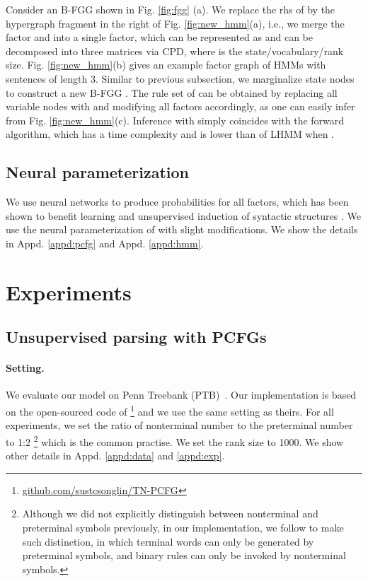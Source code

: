 \documentclass[11pt]{article}
\begin{document}
Consider an B-FGG  shown in Fig. \ref{fig:fgg} (a). We replace the rhs of  by the hypergraph fragment in the right of Fig. \ref{fig:new_hmm}(a), i.e., we merge the factor  and  into a single factor, which can be represented as  and can be decomposed into three matrices  via CPD, where  is the  state/vocabulary/rank size. Fig. \ref{fig:new_hmm}(b) gives an example factor graph of HMMs with sentences of length 3. Similar to previous subsection, we marginalize state nodes  to construct a new B-FGG . The rule set of  can be obtained by replacing all variable nodes  with  and modifying all factors accordingly, as one can 
easily infer from Fig. \ref{fig:new_hmm}(c). Inference with  simply coincides with the forward algorithm, which has a  time complexity and is lower than  of LHMM \cite{chiu2021low} when .

\subsection{Neural parameterization}
We use neural networks to produce probabilities for all factors, which has been shown to benefit learning and unsupervised induction of syntactic structures \cite{jiang-etal-2016-unsupervised, he-etal-2018-unsupervised, kim-etal-2019-compound, han-etal-2019-enhancing,  jin-etal-2019-unsupervised, zhu-etal-2020-return, yang-etal-2020-second, yang-etal-2021-pcfgs, zhao-titov-2020-visually, zhang-etal-2021-video,  chiu-rush-2020-scaling, chiu2021low, kim2021sequence}.  We use the neural parameterization of \citet{yang-etal-2021-pcfgs} with slight modifications. We show the details in Appd. \ref{appd:pcfg} and Appd. \ref{appd:hmm}. 



\section{Experiments}
\subsection{Unsupervised parsing with PCFGs}
\paragraph{Setting.} We evaluate our model on Penn Treebank (PTB)~\citep{marcus-etal-1994-penn}. Our implementation is based on the open-sourced code of \citet{yang-etal-2021-pcfgs}\footnote{\url{github.com/sustcsonglin/TN-PCFG}} and we use the same setting as theirs. For all experiments, we set the ratio of nonterminal number to the preterminal number to 1:2 \footnote{Although we did not explicitly distinguish between nonterminal and preterminal symbols previously, in our implementation, we follow \citet{kim-etal-2019-compound} to make such distinction, in which terminal words can only be generated by preterminal symbols, and binary rules can only be invoked by nonterminal symbols.} which is the common practise. We set the rank size to 1000. We show other details in Appd. \ref{appd:data} and \ref{appd:exp}. 
\end{document}
